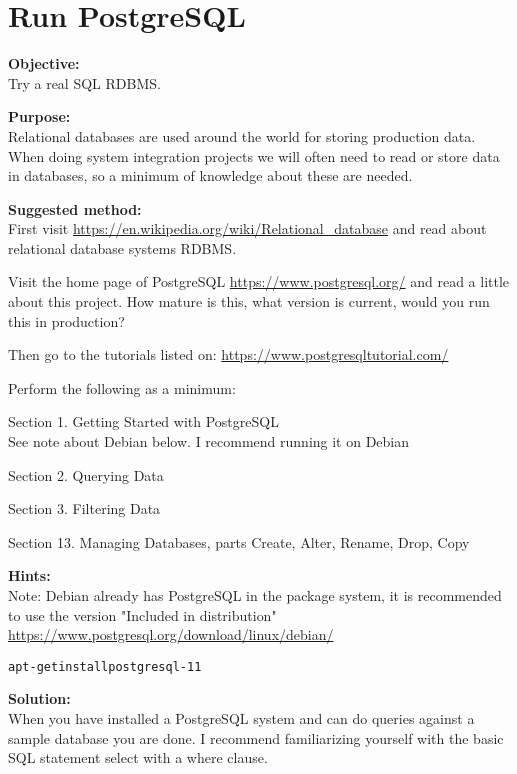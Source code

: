 \documentclass[a4paper,11pt,notitlepage]{report}
\begin{document}
\chapter{Run PostgreSQL}
\label{ex:postgresql-tutorial}


{\bf Objective:}\\
Try a real SQL RDBMS.

{\bf Purpose:}\\
Relational databases are used around the world for storing production data. When doing system integration projects we will often need to read or store data in databases, so a minimum of knowledge about these are needed.


{\bf Suggested method:}\\
First visit \url{https://en.wikipedia.org/wiki/Relational_database}
and read about relational database systems RDBMS.

Visit the home page of PostgreSQL \url{https://www.postgresql.org/} and read a little about this project. How mature is this, what version is current, would you run this in production?

Then go to the tutorials listed on:
\url{https://www.postgresqltutorial.com/}

Perform the following as a minimum:
\begin{list2}
\item Section 1. Getting Started with PostgreSQL\\
See note about Debian below. I recommend running it on Debian
\item Section 2. Querying Data
\item Section 3. Filtering Data
\item Section 13. Managing Databases, parts Create, Alter, Rename, Drop, Copy
\end{list2}



{\bf Hints:}\\
Note: Debian already has PostgreSQL in the package system, it is recommended to use the version "Included in distribution"\\ \url{https://www.postgresql.org/download/linux/debian/}

\begin{alltt}
apt-get install postgresql-11
\end{alltt}

{\bf Solution:}\\
When you have installed a PostgreSQL system and can do queries against a sample database you are done. I recommend familiarizing yourself with the basic SQL statement select with a where clause.
\end{document}

